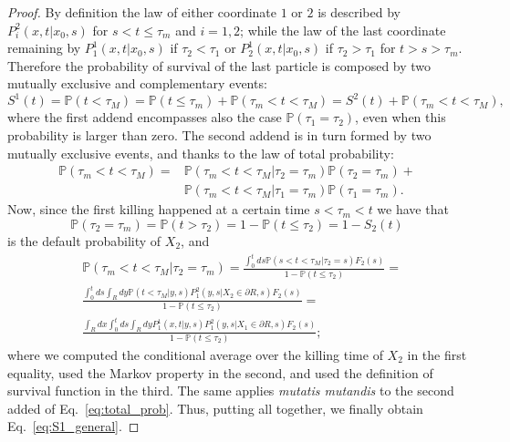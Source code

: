 \documentclass[10pt,a4paper]{amsart}
\begin{document}
  \begin{proof}
    By definition the law of either coordinate $1$ or $2$ is described by $P^2_i(x,t|x_0,s)$ for $s<t\leq\tau_m$ and $i=1,2$; while the law of the last coordinate remaining by $P^1_1(x,t|x_0,s)$ if $\tau_2<\tau_1$ or $P^1_2(x,t|x_0,s)$ if $\tau_2>\tau_1$ for $t>s>\tau_m$. Therefore the probability of survival of the last particle is composed by two mutually exclusive and complementary events:
    \begin{equation}
      S^1(t)=\mathbb{P}(t<\tau_M)=\mathbb{P}(t\leq\tau_m)+\mathbb{P}(\tau_m<t<\tau_M)=S^2(t)+\mathbb{P}(\tau_m<t<\tau_M),
    \end{equation}
    where the first addend encompasses also the case $\mathbb{P}(\tau_1=\tau_2)$, even when this probability is larger than zero. The second addend is in turn formed by two mutually exclusive events, and thanks to the law of total probability:
    \begin{equation}
      \label{eq:total_prob}
      \begin{aligned}
        \mathbb{P}(\tau_m<t<\tau_M)=&\mathbb{P}(\tau_m<t<\tau_M|\tau_2=\tau_m)\mathbb{P}(\tau_2=\tau_m)+\\
        &\mathbb{P}(\tau_m<t<\tau_M|\tau_1=\tau_m)\mathbb{P}(\tau_1=\tau_m).
      \end{aligned}
    \end{equation}
    Now, since the first killing happened at a certain time $s<\tau_m<t$ we have that
    \begin{equation}
      \mathbb{P}(\tau_2=\tau_m)=\mathbb{P}(t>\tau_2)=1-\mathbb{P}(t\leq\tau_2)=1-S_2(t)
    \end{equation}
    is the default probability of $X_2$, and
    \begin{equation}
      \begin{aligned}
        &\mathbb{P}(\tau_m<t<\tau_M|\tau_2=\tau_m)=\frac{\int_0^tds \mathbb{P}(s<t<\tau_M|\tau_2=s)F_{2}(s)}{1-\mathbb{P}(t\leq\tau_2)}=\\
        &\frac{\int_0^tds \int_Rdy \mathbb{P}(t<\tau_M|y,s)P^2_1(y,s|X_2 \in \partial R,s)F_{2}(s)}{1-\mathbb{P}(t\leq\tau_2)}=\\
        &\frac{\int_Rdx\int_0^tds \int_Rdy P^1_1(x,t|y,s)P^2_1(y,s|X_1 \in \partial R,s)F_{2}(s)}{1-\mathbb{P}(t\leq\tau_2)};
      \end{aligned}
    \end{equation}
    where we computed the conditional average over the killing time of $X_2$ in the first equality, used the Markov property in the second, and used the definition of survival function in the third. The same applies\emph{ mutatis mutandis} to the second added of Eq.~\eqref{eq:total_prob}. Thus, putting all together, we finally obtain Eq.~\eqref{eq:S1_general}.
  \end{proof}
\end{document}
